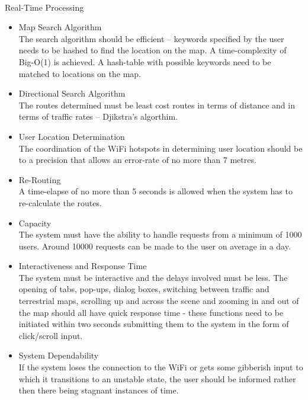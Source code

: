 \documentclass[runningheads,a4paper]{article}
\begin{document}

\noindent \\ Real-Time Processing

\begin{itemize}
\item Map Search Algorithm\\The search algorithm should be efficient – keywords specified by the user needs to be hashed to find the location on the map. A time-complexity of Big-O(1) is achieved. A hash-table with possible keywords need to be matched to locations on the map.

\item Directional Search Algorithm\\The routes determined must be least cost routes in terms of distance and in terms of traffic rates – Djikstra’s algorthim.

\item User Location Determination\\The coordination of the WiFi hotspots in determining user location should be to a precision that allows an error-rate of no more than 7 metres.

\item Re-Routing\\A time-elapse of no more than 5 seconds is allowed when the system has to re-calculate the routes.

\item Capacity\\The system must have the ability to handle requests from a minimum of 1000 users. Around 10000 requests can be made to the user on average in a day.

\item Interactiveness and Response Time\\The system must be interactive and the delays involved must be less. The opening of tabs, pop-ups, dialog boxes, switching between traffic and terrestrial maps, scrolling up and across the scene and zooming in and out of the map should all have quick response time - these functions need to be initiated within two seconds submitting them to the system in the form of click/scroll input.

\item System Dependability\\If the system loses the connection to the WiFi or gets some gibberish input to which it transitions to an unstable state, the user should be informed rather then there being stagnant instances of time.

\end{itemize}
\end{document}
